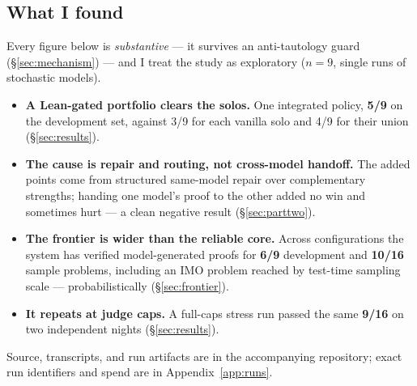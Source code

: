 \subsection{What I found}
Every figure below is \emph{substantive} --- it survives an anti-tautology guard
(\S\ref{sec:mechanism}) --- and I treat the study as exploratory ($n=9$, single
runs of stochastic models).
\begin{itemize}
  \item \textbf{A Lean-gated portfolio clears the solos.} One integrated policy,
        \textbf{5/9} on the development set, against 3/9 for each vanilla solo and
        4/9 for their union (\S\ref{sec:results}).
  \item \textbf{The cause is repair and routing, not cross-model handoff.} The
        added points come from structured same-model repair over complementary
        strengths; handing one model's proof to the other added no win and
        sometimes hurt --- a clean negative result (\S\ref{sec:parttwo}).
  \item \textbf{The frontier is wider than the reliable core.} Across
        configurations the system has verified model-generated proofs for
        \textbf{6/9} development and \textbf{10/16} sample problems, including an
        IMO problem reached by test-time sampling scale --- probabilistically
        (\S\ref{sec:frontier}).
  \item \textbf{It repeats at judge caps.} A full-caps stress run passed the same
        \textbf{9/16} on two independent nights (\S\ref{sec:results}).
\end{itemize}
Source, transcripts, and run artifacts are in the accompanying repository; exact
run identifiers and spend are in Appendix~\ref{app:runs}.
